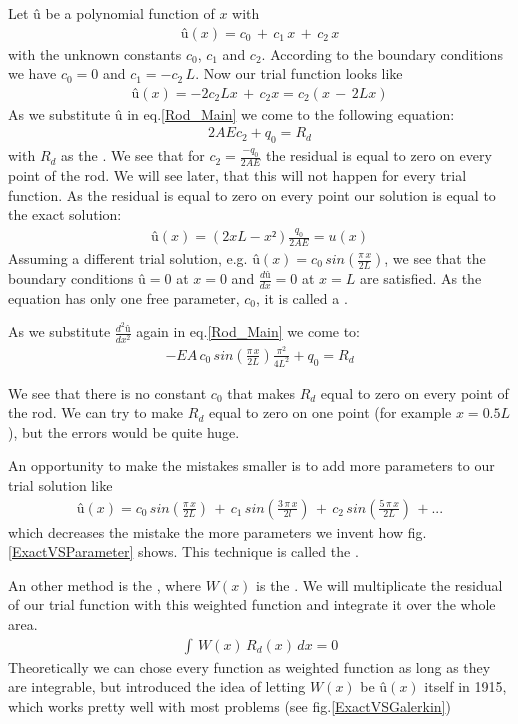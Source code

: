 Let $û$ be a polynomial function of $x$ with 
\begin{align}
û(x)=c_0\,+\,c_1\,x\,+\,c_2\,x
\end{align}
with the unknown constants $c_0$, $c_1$ and $c_2$. According to the boundary conditions we have $c_0=0$ and $c_1=-c_2\,L$. Now our trial function looks like
\begin{align}
û(x)=-2c_2Lx\,+\,c_2x=c_2(x\,-\,2Lx)
\end{align}
As we substitute $û$ in eq.\ref{Rod_Main} we come to the following equation:
\begin{align}
2AEc_2+q_0=R_d
\end{align}
with $R_d$ as the . We see that for $c_2=\frac{-q_0}{2AE}$ the residual is equal to zero on every point of the rod. We will see later, that this will not happen for every trial function. As the residual is equal to zero on every point our solution is equal to the exact solution:
\begin{align}
û(x)=(2xL-x²)\frac{q_0}{2AE}=u(x)
\end{align}
Assuming a different trial solution, e.g. $û(x)=c_0\,sin(\frac{\pi\,x}{2L})$, we see that the boundary conditions $û=0$ at $x=0$ and $\frac{dû}{dx}=0$ at $x=L$ are satisfied. As the equation has only one free parameter, $c_0$, it is called a .

As we substitute $\frac{d^2û}{dx^2}$ again in eq.\ref{Rod_Main} we come to:
\begin{align}
-EA\, c_0\,sin\left(\frac{\pi\,x}{2L}\right)\frac{\pi^2}{4L^2}+q_0=R_d
\end{align}

We see that there is no constant $c_0$ that makes $R_d$ equal to zero on every point of the rod. We can try to make $R_d$ equal to zero on one point (for example $x=0.5L$), but the errors would be quite huge. 

An opportunity to make the mistakes smaller is to add more parameters to our trial solution like
\begin{align}
û(x)=c_0\,sin\left(\frac{\pi\,x}{2L}\right)\,+\,c_1\,sin\left(\frac{3\,\pi\,x}{2l}\right)\,+\,c_2\,sin\left(\frac{5\,\pi\,x}{2L}\right)\,+...
\end{align}
which decreases the mistake the more parameters we invent how fig.\ref{ExactVSParameter} shows. This technique is called the .

\bigskip
An other method is the , where $W(x)$ is the . We will multiplicate the residual of our trial function with this weighted function and integrate it over the whole area. 
\begin{align}
\int\,W(x)\,R_d(x)\,dx=0
\end{align}
Theoretically we can chose every function as weighted function as long as they are integrable, but  introduced the idea of letting $W(x)$ be $û(x)$ itself in 1915, which works pretty well with most problems (see fig.\ref{ExactVSGalerkin})

